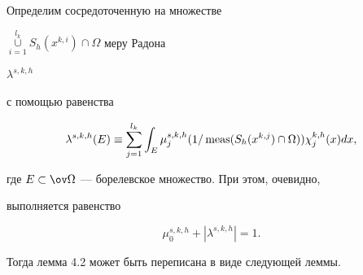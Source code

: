  


Определим сосредоточенную на множестве 


$\mathop{\cup}\limits^{l_k}_{i=1}S_h(x^{k,i})\cap\Omega$ меру Радона 


$\lambda^{s,k,h}$ 


с помощью равенства 


$$ 


\lambda^{s,k,h}(E)\equiv\sum^{l_k}_{j=1}\int_E 


\mu^{s,k,h}_j(1/\meas(S_h(x^{k,j})\cap\Omega)) 


\chi^{k,h}_j(x)dx, 


$$ 


где $E\subset\ov\Omega$ --- борелевское множество. При этом, очевидно, 


выполняется равенство 


\begin{equation} 


\mu^{s,k,h}_0+|\lambda^{s,k,h}|=1. 


\end{equation} 


Тогда лемма 4.2 может быть переписана в виде следующей леммы. 


 


